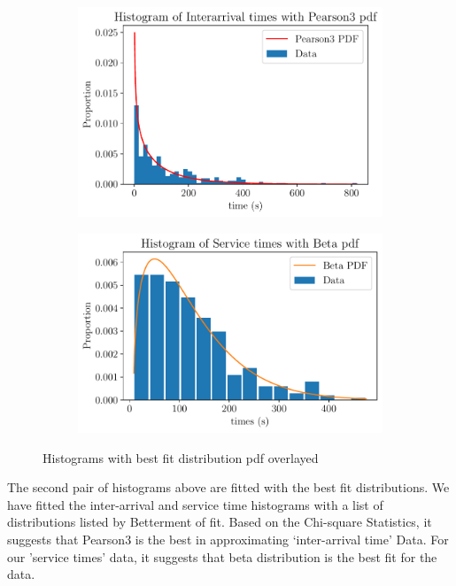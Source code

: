 \documentclass{article}
\begin{document}
\begin{figure}[H]
    \centering
    \begin{subfigure}[b]{0.45\textwidth}
        \centering
        \includegraphics[width=\textwidth]{fig3.pdf}
        \caption{}
        \label{fig:img3}
    \end{subfigure}
    \hfill
    \begin{subfigure}[b]{0.45\textwidth}
        \centering
        \includegraphics[width=\textwidth]{fig4.pdf}
        \caption{}
        \label{fig:img4}
    \end{subfigure}

    \caption{Histograms with best fit distribution pdf overlayed}
    \label{fig:two-figs2}
\end{figure}

The second pair of histograms above are fitted with the best fit distributions. We have fitted the inter-arrival and service time histograms with a list of distributions listed by Betterment of fit. Based on the Chi-square Statistics, it suggests that Pearson3 is the best in approximating ‘inter-arrival time’ Data. For our 'service times' data, it suggests that beta distribution is the best fit for the data.
\end{document}
